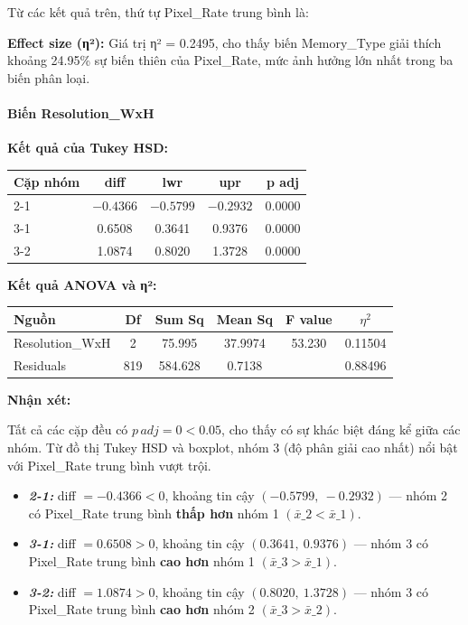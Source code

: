 Từ các kết quả trên, thứ tự Pixel\_Rate trung bình là:

\begin{center}
\end{center}

\textbf{Effect size (η²):} Giá trị η² = 0.2495, cho thấy biến Memory\_Type giải thích khoảng 24.95\% sự biến thiên của Pixel\_Rate, mức ảnh hưởng lớn nhất trong ba biến phân loại.

\paragraph{Biến Resolution\_WxH}

\textbf{Kết quả của Tukey HSD:}

\begin{longtable}{|l|c|c|c|c|}
\hline
\textbf{Cặp nhóm} & \textbf{diff} & \textbf{lwr} & \textbf{upr} & \textbf{p adj} \\
\hline
2-1 & $-0.4366$ & $-0.5799$ & $-0.2932$ & 0.0000 \\
\hline
3-1 &  0.6508  &  0.3641  &  0.9376  & 0.0000 \\
\hline
3-2 &  1.0874  &  0.8020  &  1.3728  & 0.0000 \\
\hline
\end{longtable}

\textbf{Kết quả ANOVA và η²:}

\begin{longtable}{|l|c|c|c|c|c|}
\hline
\textbf{Nguồn} & \textbf{Df} & \textbf{Sum Sq} & \textbf{Mean Sq} & \textbf{F value} & \textbf{$\eta^2$} \\
\hline
Resolution\_WxH & 2 & 75.995 & 37.9974 & 53.230 & 0.11504 \\
\hline
Residuals       & 819 & 584.628 & 0.7138  & & 0.88496 \\
\hline
\end{longtable}

\textbf{Nhận xét:}

Tất cả các cặp đều có $p\,adj = 0 < 0.05$, cho thấy có sự khác biệt đáng kể giữa các nhóm. Từ đồ thị Tukey HSD và boxplot, nhóm 3 (độ phân giải cao nhất) nổi bật với Pixel\_Rate trung bình vượt trội.
    \begin{itemize}
        \item \textbf{\textit{2-1:}} diff $= -0.4366 < 0$, khoảng tin cậy $(-0.5799,\ -0.2932)$ — nhóm 2 có Pixel\_Rate trung bình \textbf{thấp hơn} nhóm 1 $({\bar{x}}\_2 < {\bar{x}}\_1)$.
        \item \textbf{\textit{3-1:}} diff $= 0.6508 > 0$, khoảng tin cậy $(0.3641,\ 0.9376)$ — nhóm 3 có Pixel\_Rate trung bình \textbf{cao hơn} nhóm 1 $({\bar{x}}\_3 > {\bar{x}}\_1)$.
        \item \textbf{\textit{3-2:}} diff $= 1.0874 > 0$, khoảng tin cậy $(0.8020,\ 1.3728)$ — nhóm 3 có Pixel\_Rate trung bình \textbf{cao hơn} nhóm 2 $({\bar{x}}\_3 > {\bar{x}}\_2)$.
    \end{itemize}
    
